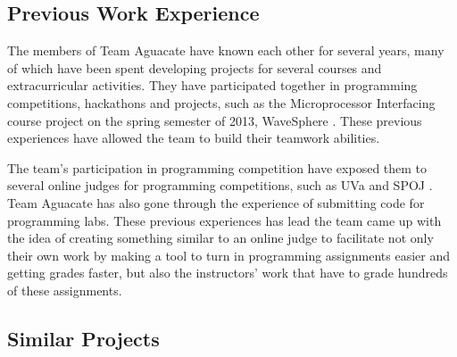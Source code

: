 
\subsection{Previous Work Experience}

The members of Team Aguacate have known each other for several years, many of
which have been spent developing projects for several courses and
extracurricular activities. They have participated together in programming
competitions, hackathons and projects, such as the Microprocessor Interfacing
course project on the spring semester of 2013, WaveSphere \cite{Micro2}. These
previous experiences have allowed the team to build their teamwork abilities.

The team's participation in programming competition have exposed them to several 
online judges for programming competitions, such as UVa
\cite{UVA} and SPOJ \cite{SPOJ}. Team Aguacate has also gone through the experience
of submitting code for programming labs. These previous experiences has lead the team 
came up with the idea of creating something similar to an online judge to 
facilitate not only their own work by making a tool to turn in programming 
assignments easier and getting grades faster, but also the instructors' work that have to 
grade hundreds of these assignments.

\subsection{Similar Projects}

